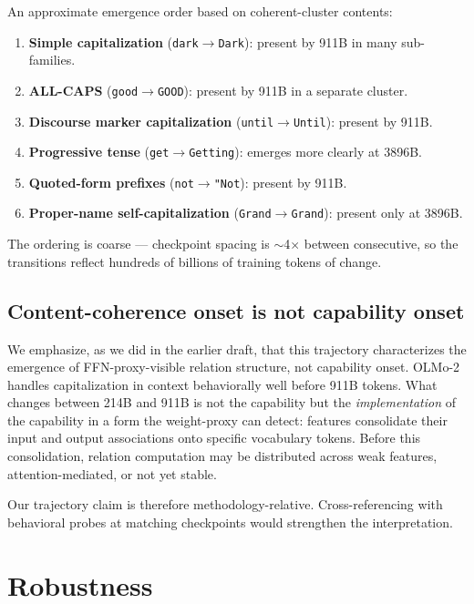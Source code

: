 \documentclass[11pt,letterpaper]{article}
\begin{document}
An approximate emergence order based on coherent-cluster contents:

\begin{enumerate}[leftmargin=*,itemsep=0pt]
\item \textbf{Simple capitalization} (\texttt{dark$\to$Dark}): present by 911B in many sub-families.
\item \textbf{ALL-CAPS} (\texttt{good$\to$GOOD}): present by 911B in a separate cluster.
\item \textbf{Discourse marker capitalization} (\texttt{until$\to$Until}): present by 911B.
\item \textbf{Progressive tense} (\texttt{get$\to$Getting}): emerges more clearly at 3896B.
\item \textbf{Quoted-form prefixes} (\texttt{not$\to$"Not}): present by 911B.
\item \textbf{Proper-name self-capitalization} (\texttt{Grand$\to$Grand}): present only at 3896B.
\end{enumerate}

The ordering is coarse --- checkpoint spacing is $\sim$4$\times$ between consecutive, so the transitions reflect hundreds of billions of training tokens of change.

\subsection{Content-coherence onset is not capability onset}

We emphasize, as we did in the earlier draft, that this trajectory characterizes the emergence of FFN-proxy-visible relation structure, not capability onset. OLMo-2 handles capitalization in context behaviorally well before 911B tokens. What changes between 214B and 911B is not the capability but the \emph{implementation} of the capability in a form the weight-proxy can detect: features consolidate their input and output associations onto specific vocabulary tokens. Before this consolidation, relation computation may be distributed across weak features, attention-mediated, or not yet stable.

Our trajectory claim is therefore methodology-relative. Cross-referencing with behavioral probes at matching checkpoints would strengthen the interpretation.

\section{Robustness}
\label{sec:robustness}
\end{document}
